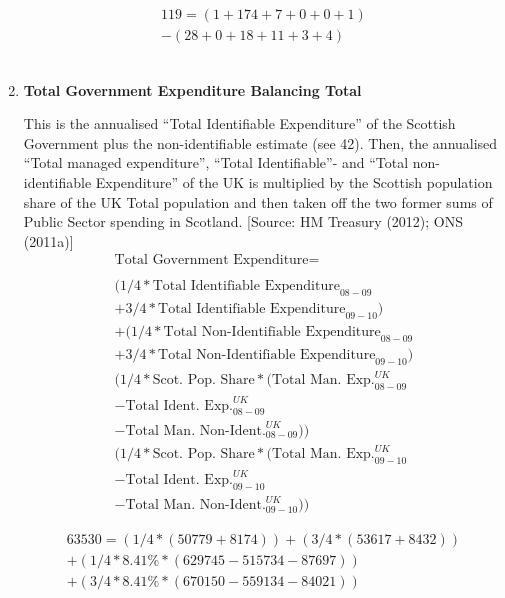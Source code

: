 \begin{enumerate}
\begin{equation} \nonumber
\begin{split}
119 = (1+174+7+0+0+1)\\
-(28+0+18+11+3+4)
\end{split}
\end{equation}\\


\item \textbf {Total Government Expenditure Balancing Total}

This is the annualised “Total Identifiable Expenditure” of the Scottish Government plus the non-identifiable estimate (see 42). Then, the annualised “Total managed expenditure”, “Total Identifiable”- and “Total non-identifiable Expenditure” of the UK is multiplied by the Scottish population share of the UK Total population and then taken off the two former sums of Public Sector spending in Scotland. [Source: HM Treasury (2012); ONS (2011a)]\\

\begin{equation}
\begin{split}
\text{Total Government Expenditure} =  \\ \\
(1/4 * \text{Total Identifiable Expenditure}_{08-09} \\
+ 3/4 * \text{Total Identifiable Expenditure}_{09-10})\\
+ (1/4 * \text{Total Non-Identifiable Expenditure}_{08-09} \\
+ 3/4 * \text{Total Non-Identifiable Expenditure}_{09-10}) \\
( 1/4 * \text{Scot. Pop. Share} * ( \text{Total Man. Exp.}^{UK}_{08-09} \\
- \text{Total Ident. Exp.}^{UK}_{08-09} \\
- \text{Total Man. Non-Ident.}^{UK}_{08-09})) \\
( 1/4 * \text{Scot. Pop. Share} * ( \text{Total Man. Exp.}^{UK}_{09-10} \\
- \text{Total Ident. Exp.}^{UK}_{09-10} \\
- \text{Total Man. Non-Ident.}^{UK}_{09-10}))
\end{split} \label{eq:2.5.47}
\end{equation}


\begin{equation} \nonumber
\begin{split}
63530 = (1/4*(50779+8174))+(3/4*(53617+8432))\\
+(1/4*8.41\%*(629745-515734-87697))\\
+(3/4*8.41\%*(670150-559134-84021))
\end{split}
\end{equation}\\



\end{enumerate}
